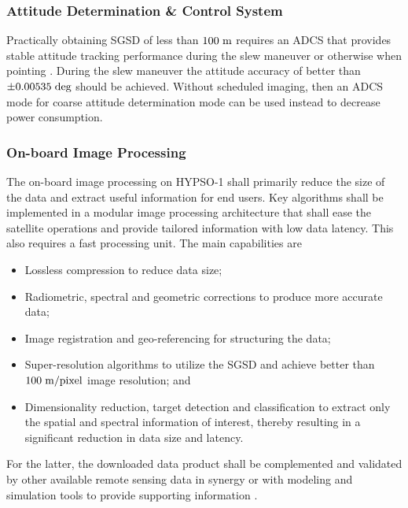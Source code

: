 \subsubsection{Attitude Determination \& Control System}
Practically obtaining SGSD of less than $100 \hspace{3pt} \rm{m}$ requires an ADCS that provides stable attitude tracking performance during the slew maneuver or otherwise when pointing \cite{Gue16, agrawal2009, Santandrea2013}. During the slew maneuver the attitude accuracy of better than $\pm 0.00535 \hspace{3pt} \rm{deg}$ should be achieved. Without scheduled imaging, then an ADCS mode for coarse attitude determination mode can be used instead to decrease power consumption.
\subsubsection{On-board Image Processing}
The on-board image processing on HYPSO-1 shall primarily reduce the size of the data and extract useful information for end users. Key algorithms shall be implemented in a modular image processing architecture that shall ease the satellite operations and provide tailored information with low data latency. This also requires a fast processing unit. The main capabilities are
\begin{itemize}
    \item Lossless compression to reduce data size;
    \item Radiometric, spectral and geometric corrections to produce more accurate data;
    \item Image registration and geo-referencing for structuring the data;
    \item Super-resolution algorithms to utilize the SGSD and achieve better than $100 \hspace{3pt} \rm{m/pixel}$ image resolution; and
    \item Dimensionality reduction, target detection and classification to extract only the spatial and spectral information of interest, thereby resulting in a significant reduction in data size and latency.
\end{itemize}
For the latter, the downloaded data product shall be complemented and validated by other available remote sensing data in synergy or with modeling and simulation tools to provide supporting information \cite{Lapadatu2019}.


